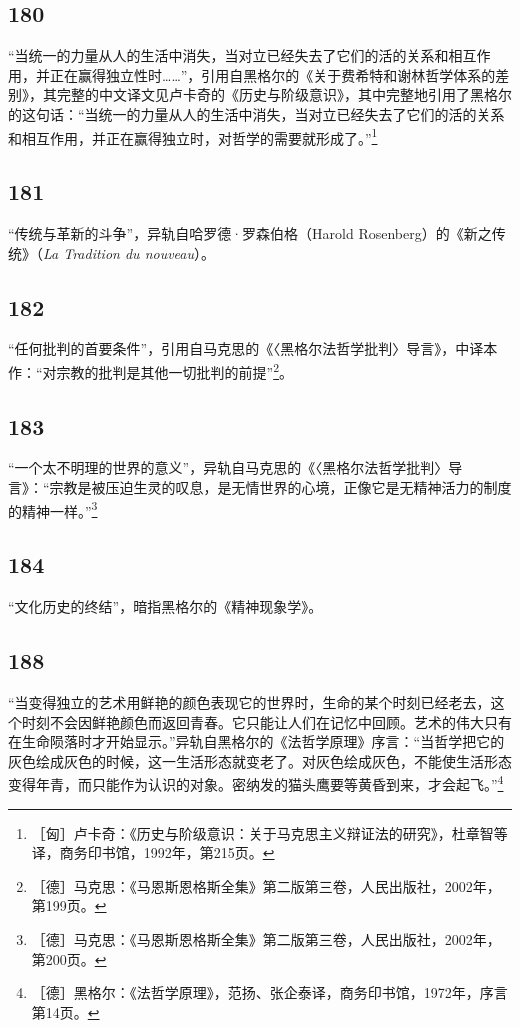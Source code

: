 \documentclass[fontset=fandol, a4paper, 12pt, openright]{ctexbook}
\begin{document}
\subsection*{180}
“当统一的力量从人的生活中消失，当对立已经失去了它们的活的关系和相互作用，并正在赢得独立性时……”，引用自黑格尔的《关于费希特和谢林哲学体系的差别》，其完整的中文译文见卢卡奇的《历史与阶级意识》，其中完整地引用了黑格尔的这句话：“当统一的力量从人的生活中消失，当对立已经失去了它们的活的关系和相互作用，并正在赢得独立时，对哲学的需要就形成了。”\footnote{［匈］卢卡奇：《历史与阶级意识：关于马克思主义辩证法的研究》，杜章智等译，商务印书馆，1992年，第215页。}

\subsection*{181}
“传统与革新的斗争”，异轨自哈罗德·罗森伯格（Harold Rosenberg）的《新之传统》（\textit{La Tradition du nouveau}）。

\subsection*{182}
“任何批判的首要条件”，引用自马克思的《〈黑格尔法哲学批判〉导言》，中译本作：“对宗教的批判是其他一切批判的前提”\footnote{［德］马克思：《马恩斯恩格斯全集》第二版第三卷，人民出版社，2002年，第199页。}。

\subsection*{183}
“一个太不明理的世界的意义”，异轨自马克思的《〈黑格尔法哲学批判〉导言》：“宗教是被压迫生灵的叹息，是无情世界的心境，正像它是无精神活力的制度的精神一样。”\footnote{［德］马克思：《马恩斯恩格斯全集》第二版第三卷，人民出版社，2002年，第200页。}

\subsection*{184}
“文化历史的终结”，暗指黑格尔的《精神现象学》。

\subsection*{188}
“当变得独立的艺术用鲜艳的颜色表现它的世界时，生命的某个时刻已经老去，这个时刻不会因鲜艳颜色而返回青春。它只能让人们在记忆中回顾。艺术的伟大只有在生命陨落时才开始显示。”异轨自黑格尔的《法哲学原理》序言：“当哲学把它的灰色绘成灰色的时候，这一生活形态就变老了。对灰色绘成灰色，不能使生活形态变得年青，而只能作为认识的对象。密纳发的猫头鹰要等黄昏到来，才会起飞。”\footnote{［德］黑格尔：《法哲学原理》，范扬、张企泰译，商务印书馆，1972年，序言第14页。}
\end{document}
